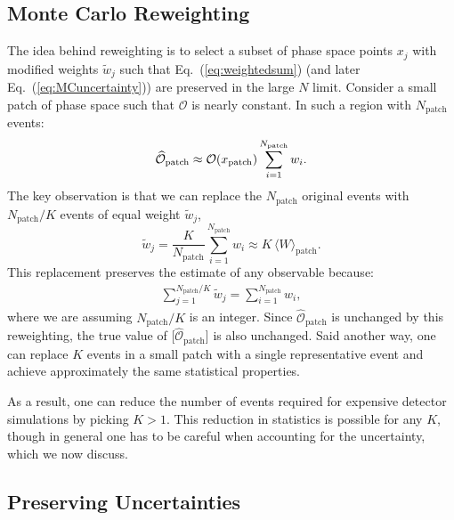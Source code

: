 \documentclass[prd,twocolumn,superscriptaddress,longbibliography,preprintnumbers,floatfix,nofootinbib]{revtex4-1}
\DeclareRobustCommand{\Eq}[1]{Eq.~(\ref{eq:#1})}
\begin{document}
\subsection{Monte Carlo Reweighting}

The idea behind reweighting is to select a subset of phase space points $x_j$ with modified weights $\widetilde{w}_j$ such that \Eq{weightedsum} (and later \Eq{MCuncertainty}) are preserved in the large $N$ limit.
%
Consider a small patch of phase space such that $\mathcal{O}$ is nearly constant.
%
In such a region with $N_\text{patch}$ events:
%
\begin{equation}
\widehat{\mathcal{O}}_\text{patch} \approx  \mathcal{O}(x_{\rm patch}) \sum_{i=1}^{N_\text{patch}} w_i.
\end{equation}
%
The key observation is that we can replace the $N_\text{patch}$ original events with $N_\text{patch}/K$ events of equal weight $\widetilde{w}_j$,
%
\begin{equation}
\label{eq:patchweight}
    \widetilde{w}_j = \frac{K}{N_\text{patch}} \sum_{i = 1}^{N_\text{patch}} w_i \approx K\, \langle W\rangle_\text{patch}.
\end{equation}
%
This replacement preserves the estimate of any observable because:
%
\begin{align}
\label{eq:patches}
     \sum_{j=1}^{N_\text{patch}/K} \widetilde{w}_j = \sum_{i=1}^{N_\text{patch}} w_i,
\end{align}
%
where we are assuming $N_\text{patch}/K$ is an integer.
%
Since $\widehat{\mathcal{O}}_\text{patch}$ is unchanged by this reweighting, the true value of [$\widehat{\mathcal{O}}_\text{patch}$] is also unchanged.
%
Said another way, one can replace $K$ events in a small patch with a single representative event and achieve approximately the same statistical properties.


As a result, one can reduce the number of events required for expensive detector simulations by picking $K>1$. 
%
This reduction in statistics is possible for any $K$, though in general one has to be careful when accounting for the uncertainty, which we now discuss.

\subsection{Preserving Uncertainties}
\label{sec:preserve_unc}
\end{document}
